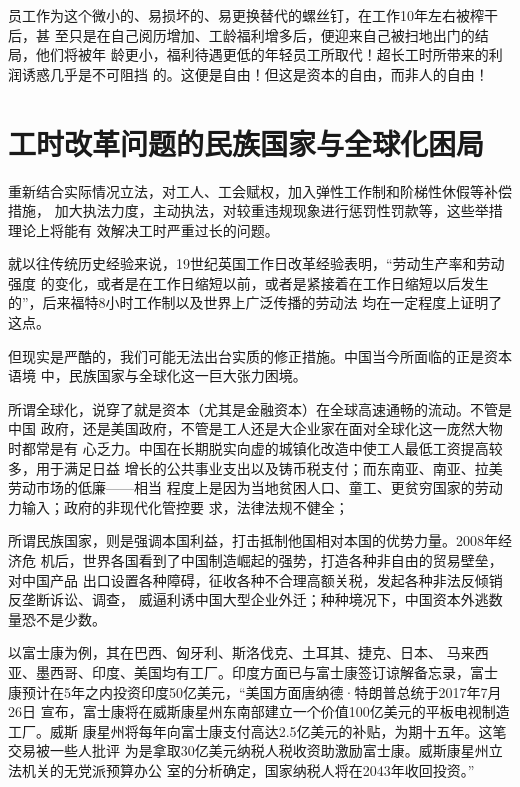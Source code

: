 
员工作为这个微小的、易损坏的、易更换替代的螺丝钉，在工作10年左右被榨干后，甚
至只是在自己阅历增加、工龄福利增多后，便迎来自己被扫地出门的结局，他们将被年
龄更小，福利待遇更低的年轻员工所取代！超长工时所带来的利润诱惑几乎是不可阻挡
的。这便是自由！但这是资本的自由，而非人的自由！

\section{工时改革问题的民族国家与全球化困局}

重新结合实际情况立法，对工人、工会赋权，加入弹性工作制和阶梯性休假等补偿措施，
加大执法力度，主动执法，对较重违规现象进行惩罚性罚款等，这些举措理论上将能有
效解决工时严重过长的问题。

就以往传统历史经验来说，19世纪英国工作日改革经验表明，“劳动生产率和劳动强度
的变化，或者是在工作日缩短以前，或者是紧接着在工作日缩短以后发生
的”，后来福特8小时工作制以及世界上广泛传播的劳动法
均在一定程度上证明了这点。

但现实是严酷的，我们可能无法出台实质的修正措施。中国当今所面临的正是资本语境
中，民族国家与全球化这一巨大张力困境。

所谓全球化，说穿了就是资本（尤其是金融资本）在全球高速通畅的流动。不管是中国
政府，还是美国政府，不管是工人还是大企业家在面对全球化这一庞然大物时都常是有
心乏力。中国在长期脱实向虚的城镇化改造中使工人最低工资提高较多，用于满足日益
增长的公共事业支出以及铸币税支付；而东南亚、南亚、拉美劳动市场的低廉——相当
程度上是因为当地贫困人口、童工、更贫穷国家的劳动力输入；政府的非现代化管控要
求，法律法规不健全；

所谓民族国家，则是强调本国利益，打击抵制他国相对本国的优势力量。2008年经济危
机后，世界各国看到了中国制造崛起的强势，打造各种非自由的贸易壁垒，对中国产品
出口设置各种障碍，征收各种不合理高额关税，发起各种非法反倾销反垄断诉讼、调查，
威逼利诱中国大型企业外迁；种种境况下，中国资本外逃数量恐不是少数。


以富士康\cite{foxconnwiki}为例，其在巴西、匈牙利、斯洛伐克、土耳其、捷克、日本、
马来西亚、墨西哥、印度、美国均有工厂。印度方面已与富士康签订谅解备忘录，富士
康预计在5年之内投资印度50亿美元，“美国方面唐纳德·特朗普总统于2017年7月26日
宣布，富士康将在威斯康星州东南部建立一个价值100亿美元的平板电视制造工厂。威斯
康星州将每年向富士康支付高达2.5亿美元的补贴，为期十五年。这笔交易被一些人批评
为是拿取30亿美元纳税人税收资助激励富士康。威斯康星州立法机关的无党派预算办公
室的分析确定，国家纳税人将在2043年收回投资。”

